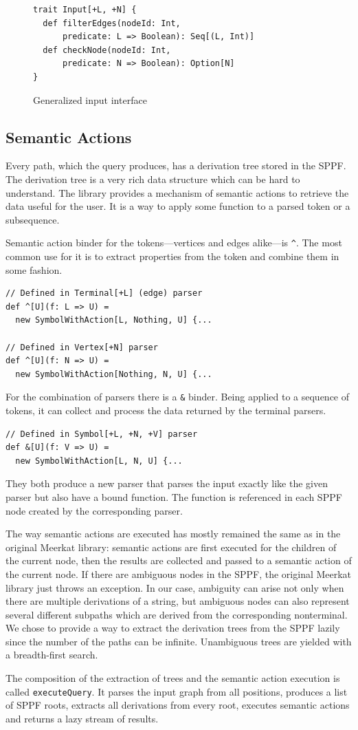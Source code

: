 \begin{figure}[h]
\begin{lstlisting}
trait Input[+L, +N] {
  def filterEdges(nodeId: Int,
      predicate: L => Boolean): Seq[(L, Int)]
  def checkNode(nodeId: Int,
      predicate: N => Boolean): Option[N]
}

\end{lstlisting}
\caption{Generalized input interface}
\label{fig:input}
\end{figure}

\subsection{Semantic Actions}
\label{sec:semanticActions}

Every path, which the query produces, has a derivation tree stored in the SPPF.
The derivation tree is a very rich data structure which can be hard to understand.
The library provides a mechanism of semantic actions to retrieve the data useful for the user.
It is a way to apply some function to a parsed token or a subsequence.

Semantic action binder for the tokens---vertices and edges alike---is \lstinline{^}. The most common use for it is to extract properties from the token and combine them in some fashion.

\begin{lstlisting}
// Defined in Terminal[+L] (edge) parser
def ^[U](f: L => U) =
  new SymbolWithAction[L, Nothing, U] {...

// Defined in Vertex[+N] parser
def ^[U](f: N => U) =
  new SymbolWithAction[Nothing, N, U] {...
\end{lstlisting}

For the combination of parsers there is a \lstinline{&} binder. Being  applied to a sequence of tokens, it can collect and process the data returned by the terminal parsers.

\begin{lstlisting}
// Defined in Symbol[+L, +N, +V] parser
def &[U](f: V => U) =
  new SymbolWithAction[L, N, U] {...
\end{lstlisting}

They both produce a new parser that parses the input exactly like the given parser but also have a bound function.
The function is referenced in each SPPF node created by the corresponding parser.

The way semantic actions are executed has mostly remained the same as in the original Meerkat library: semantic actions are first executed for the children of the current node, then the results are collected and passed to a semantic action of the current node.
If there are ambiguous nodes in the SPPF, the original Meerkat library just throws an exception.
In our case, ambiguity can arise not only when there are multiple derivations of a string, but ambiguous nodes can also represent several different subpaths which are derived from the corresponding nonterminal.
We chose to provide a way to extract the derivation trees from the SPPF lazily since the number of the paths can be infinite.
Unambiguous trees are yielded with a breadth-first search.

The composition of the extraction of trees and the semantic action execution is called \lstinline{executeQuery}.
It parses the input graph from all positions, produces a list of SPPF roots, extracts all derivations from every root, executes semantic actions and returns a lazy stream of results.